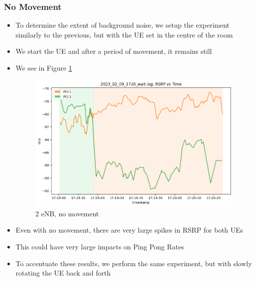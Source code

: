 \subsubsection{No Movement}
\begin{itemize}
    \item To determine the extent of background noise, we setup the experiment similarly to the previous, but with the UE set in the centre of the room
    \item We start the UE and after a period of movement, it remains still
    \item We see in Figure \ref{fig:methods:2024-02-09-wait}

\begin{figure}
    \centering
    \includegraphics[width=0.75\linewidth]{src//img/2024_02_09_wait.png}
    \caption{2 eNB, no movement}
    \label{fig:methods:2024-02-09-wait}
\end{figure}

    \item Even with no movement, there are very large spikes in RSRP for both UEs
    \item This could have very large impacts on Ping Pong Rates
    \item To accentuate these results, we perform the same experiment, but with slowly rotating the UE back and forth
\end{itemize}

